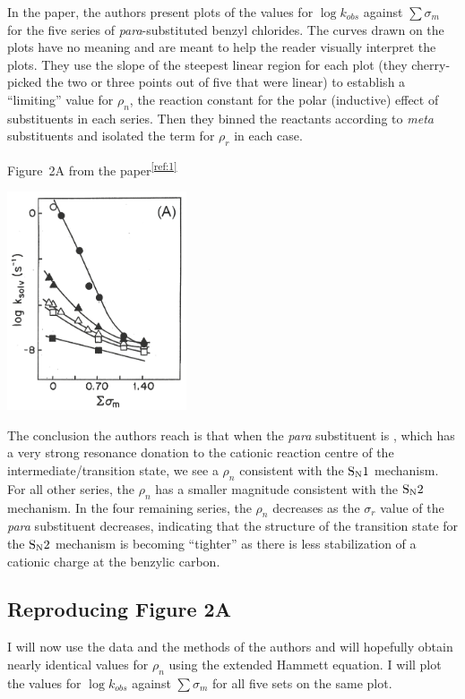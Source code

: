 \documentclass{tufte-handout}
\newcommand{\tss}[1]{\textsuperscript{#1}}
\begin{document}
In the paper, the authors present plots of the values for $\log{k_{obs}}$ against $\sum \sigma_m$ for the five series of \textit{para}-substituted benzyl chlorides. The curves drawn on the plots have no meaning and are meant to help the reader visually interpret the plots.  They use the slope of the steepest linear region for each plot (they cherry-picked the two or three points out of five that were linear) to establish a ``limiting'' value for $\rho_n$, the reaction constant for the polar (inductive) effect of substituents in each series. Then they binned the reactants according to \textit{meta} substituents and isolated the term for $\rho_r$ in each case.


\begin{marginfigure}[0mm]
  \centering
    \caption[-0mm]{Figure~2A from the paper\tss{\ref{ref:1}} \label{fig:paperfig2A}}  
    \includegraphics[width=150pt]{images/fig2Apaper.png}
\end{marginfigure}


The conclusion the authors reach is that when the \textit{para} substituent is , which has a very strong resonance donation to the cationic reaction centre of the intermediate/transition state, we see a $\rho_n$ consistent with the $\rm S_N1$ mechanism. For all other series, the $\rho_n$ has a smaller magnitude consistent with the $\rm S_N2$ mechanism. In the four remaining series, the $\rho_n$ decreases as the $\sigma_r$ value of the \textit{para} substituent decreases, indicating that the structure of the transition state for the $\rm S_N2$ mechanism is becoming ``tighter'' as there is less stabilization of a cationic charge at the benzylic carbon.

\subsection{Reproducing Figure 2A}
I will now use the data and the methods of the authors and will hopefully obtain nearly identical values for $\rho_n$ using the extended Hammett equation. I will plot the values for $\log{k_{obs}}$ against $\sum \sigma_m$ for all five sets on the same plot.
\end{document}
